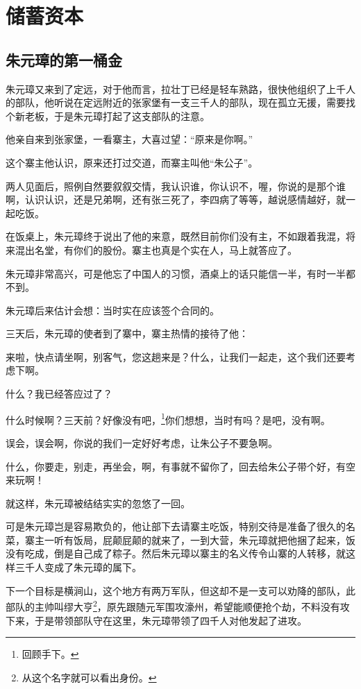 \section{储蓄资本}
\ifnum{}
	\begin{multicols}{\theparacolNo}
		\fi
		\subsection{朱元璋的第一桶金}
		朱元璋又来到了定远，对于他而言，拉壮丁已经是轻车熟路，很快他组织了上千人的部队，他听说在定远附近的张家堡有一支三千人的部队，现在孤立无援，需要找个新老板，于是朱元璋打起了这支部队的注意。

		他亲自来到张家堡，一看寨主，大喜过望：“原来是你啊。”

		这个寨主他认识，原来还打过交道，而寨主叫他“朱公子”。

		两人见面后，照例自然要叙叙交情，我认识谁，你认识不，喔，你说的是那个谁啊，认识认识，还是兄弟啊，还有张三死了，李四病了等等，越说感情越好，就一起吃饭。

		在饭桌上，朱元璋终于说出了他的来意，既然目前你们没有主，不如跟着我混，将来混出名堂，有你们的股份。寨主也真是个实在人，马上就答应了。

		朱元璋非常高兴，可是他忘了中国人的习惯，酒桌上的话只能信一半，有时一半都不到。

		朱元璋后来估计会想：当时实在应该签个合同的。

		三天后，朱元璋的使者到了寨中，寨主热情的接待了他：

		来啦，快点请坐啊，别客气，您这趟来是？什么，让我们一起走，这个我们还要考虑下啊。

		什么？我已经答应过了？

		什么时候啊？三天前？好像没有吧，\footnote{回顾手下。}你们想想，当时有吗？是吧，没有啊。

		误会，误会啊，你说的我们一定好好考虑，让朱公子不要急啊。

		什么，你要走，别走，再坐会，啊，有事就不留你了，回去给朱公子带个好，有空来玩啊！

		就这样，朱元璋被结结实实的忽悠了一回。

		可是朱元璋岂是容易欺负的，他让部下去请寨主吃饭，特别交待是准备了很久的名菜，寨主一听有饭局，屁颠屁颠的就来了，一到大营，朱元璋就把他捆了起来，饭没有吃成，倒是自己成了粽子。然后朱元璋以寨主的名义传令山寨的人转移，就这样三千人变成了朱元璋的属下。

		下一个目标是横涧山，这个地方有两万军队，但这却不是一支可以劝降的部队，此部队的主帅叫缪大亨\footnote{从这个名字就可以看出身份。}，原先跟随元军围攻濠州，希望能顺便抢个劫，不料没有攻下来，于是带领部队守在这里，朱元璋带领了四千人对他发起了进攻。


\end{multicols}
